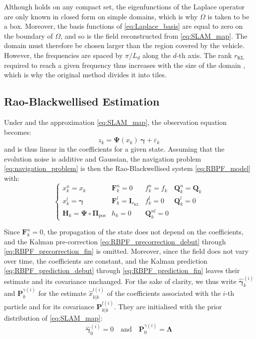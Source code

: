 \begin{remark}
	Although  holds on any compact set, the eigenfunctions of the Laplace operator are only known in closed form on simple domains, which is why $\Omega$ is taken to be a box. Moreover, the basis functions of \eqref{eq:Laplace_basis} are equal to zero on the boundary of $\Omega$, and so is the field reconstructed from \eqref{eq:SLAM_map}. The domain must therefore be chosen larger than the region covered by the vehicle. However, the frequencies are spaced by $\pi/L_d$ along the $d$-th axis. The rank $r_{\mathrm{KL}}$ required to reach a given frequency thus increases with the size of the domain \cite{bib:reduced-rank-practical}, which is why the original method divides it into tiles.
\end{remark}

\subsection{Rao-Blackwellised Estimation}

Under  and the approximation \eqref{eq:SLAM_map}, the observation equation becomes:
\begin{equation}
	z_k=\boldsymbol{\Psi}(x_k)\:\boldsymbol{\gamma}+\varepsilon_k
\end{equation}
and is thus linear in the coefficients for a given state. Assuming that the evolution noise is additive and Gaussian, the navigation problem \eqref{eq:navigation_problem} is then the Rao-Blackwellised system \eqref{eq:RBPF_model}
with:
\begin{equation}
	\left\{\begin{array}{llll}
	x_k^n=x_k&\mathbf{F}_k^n=0&f_k^n=f_k&\mathbf{Q}_k^n=\mathbf{Q}_k\\
	x_k^l=\boldsymbol{\gamma}&\mathbf{F}_k^l=\mathbf{I}_{r_{\mathrm{KL}}}&f_k^l=0&\mathbf{Q}_k^l=0\\
	\mathbf{H}_k=\boldsymbol{\Psi}\circ\boldsymbol{\Pi}_{\mathrm{pos}}&h_k=0&\mathbf{Q}_k^{nl}=0&
	\end{array}\right.
\end{equation}

Since $\mathbf{F}_k^n=0$, the propagation of the state does not depend on the coefficients, and the Kalman pre-correction \eqref{eq:RBPF_precorrection_debut} through \eqref{eq:RBPF_precorrection_fin} is omitted. Moreover, since the field does not vary over time, the coefficients are constant, and the Kalman prediction \eqref{eq:RBPF_prediction_debut} through \eqref{eq:RBPF_prediction_fin} leaves their estimate and its covariance unchanged. For the sake of clarity, we thus write $\hat{\boldsymbol{\gamma}}_k^{(i)}$ and $\mathbf{P}_k^{\gamma(i)}$ for the estimate $\hat{x}_{k|k}^{l(i)}$ of the coefficients associated with the $i$-th particle and for its covariance $\mathbf{P}_{k|k}^{l(i)}$. They are initialised with the prior distribution of \eqref{eq:SLAM_map}:
\begin{equation}
	\hat{\boldsymbol{\gamma}}_0^{(i)}=0\quad\text{and}\quad \mathbf{P}_0^{\gamma(i)}=\boldsymbol{\Lambda}
\end{equation}

